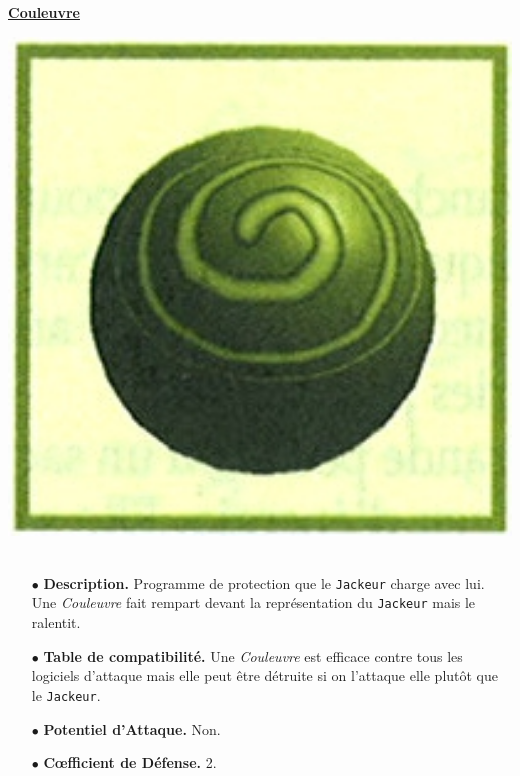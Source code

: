 \documentclass[11pt,twoside,a4paper]{article}
\begin{document}
\begin{multicols*}{2}
\underline{\textbf{Couleuvre}}~\\
\begin{minipage}[h]{0.12\textwidth}
	\includegraphics[width=1.20\textwidth]{img/catalogueProgrammesCouleuvre.jpg}~\\
\end{minipage} \hfill \begin{minipage}[h]{0.37\textwidth}
	\begin{itemize}
		\item[$\bullet$] \textbf{Description. } Programme de protection que le \texttt{Jackeur} charge avec lui. Une \emph{Couleuvre} fait rempart devant la repr{\'e}sentation du \texttt{Jackeur} mais le ralentit. 
	\end{itemize}
\end{minipage}
\begin{itemize}
	\item[$\bullet$] \textbf{Table de compatibilit{\'e}. }Une \emph{Couleuvre} est efficace contre tous les logiciels d'attaque mais elle peut {\^e}tre d{\'e}truite si on l'attaque elle plut{\^o}t que le \texttt{Jackeur}. 
	\item[$\bullet$] \textbf{Potentiel d'Attaque. }Non. 
	\item[$\bullet$] \textbf{C\oe fficient de D{\'e}fense. }2. 

\end{itemize}
\end{multicols*}
\end{document}

